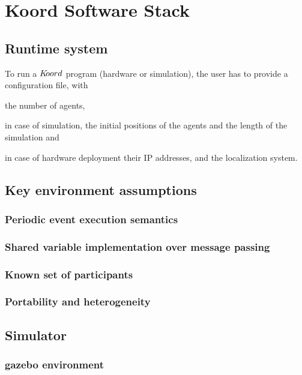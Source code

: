 \section{Koord Software Stack}
\label{sec:software}

\subsection{Runtime system}



To run a $K\kern-2pt oord$ program (hardware or simulation), the user has to provide a configuration file, with
\begin{inparaenum}
    \item the number of agents,
    \item in case of simulation, the initial positions of the agents and the length of the simulation and
    \item in case of hardware deployment their IP addresses,
    and the localization system.
\end{inparaenum}

\subsection{Key environment assumptions}


\subsubsection{Periodic event execution semantics}


\subsubsection{Shared variable implementation over message passing}


\subsubsection{Known set of participants}
\subsubsection{Portability and heterogeneity}


\subsection{Simulator}
\subsubsection{gazebo environment}
